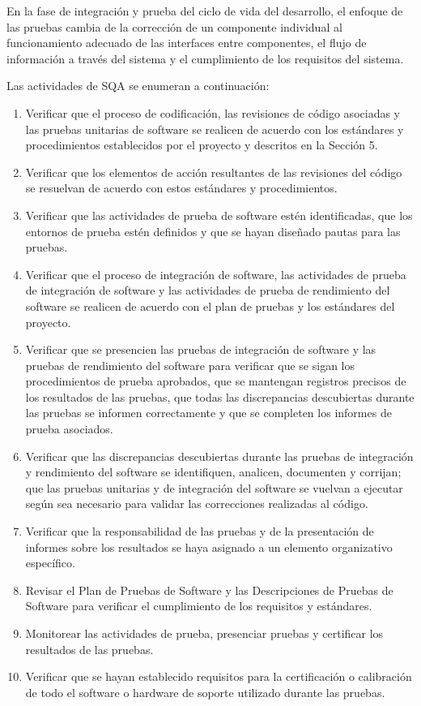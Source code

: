 En la fase de integración y prueba del ciclo de vida del desarrollo, el enfoque de las pruebas cambia de la corrección de un componente individual al funcionamiento adecuado de las interfaces entre componentes, el flujo de información a través del sistema y el cumplimiento de los requisitos del sistema.

Las actividades de SQA se enumeran a continuación:
\begin{enumerate}
    \item Verificar que el proceso de codificación, las revisiones de código asociadas y las pruebas unitarias de software se realicen de acuerdo con los estándares y procedimientos establecidos por el proyecto y descritos en la Sección 5.
    \item Verificar que los elementos de acción resultantes de las revisiones del código se resuelvan de acuerdo con estos estándares y procedimientos.
    \item Verificar que las actividades de prueba de software estén identificadas, que los entornos de prueba estén definidos y que se hayan diseñado pautas para las pruebas.
    \item Verificar que el proceso de integración de software, las actividades de prueba de integración de software y las actividades de prueba de rendimiento del software se realicen de acuerdo con el plan de pruebas y los estándares del proyecto.
    \item Verificar que se presencien las pruebas de integración de software y las pruebas de rendimiento del software para verificar que se sigan los procedimientos de prueba aprobados, que se mantengan registros precisos de los resultados de las pruebas, que todas las discrepancias descubiertas durante las pruebas se informen correctamente y que se completen los informes de prueba asociados.
    \item Verificar que las discrepancias descubiertas durante las pruebas de integración y rendimiento del software se identifiquen, analicen, documenten y corrijan; que las pruebas unitarias y de integración del software se vuelvan a ejecutar según sea necesario para validar las correcciones realizadas al código.
    \item Verificar que la responsabilidad de las pruebas y de la presentación de informes sobre los resultados se haya asignado a un elemento organizativo específico.
    \item Revisar el Plan de Pruebas de Software y las Descripciones de Pruebas de Software para verificar el cumplimiento de los requisitos y estándares.
    \item Monitorear las actividades de prueba, presenciar pruebas y certificar los resultados de las pruebas.
    \item Verificar que se hayan establecido requisitos para la certificación o calibración de todo el software o hardware de soporte utilizado durante las pruebas.
\end{enumerate}

